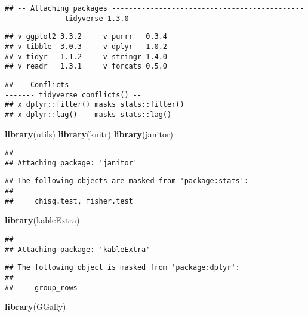 \documentclass[
]{article}
\newenvironment{Shaded}{\begin{snugshade}}{\end{snugshade}}
\newcommand{\KeywordTok}[1]{\textcolor[rgb]{0.13,0.29,0.53}{\textbf{#1}}}
\newcommand{\NormalTok}[1]{#1}
\begin{document}
\begin{verbatim}
## -- Attaching packages ---------------------------------------------------------- tidyverse 1.3.0 --
\end{verbatim}

\begin{verbatim}
## v ggplot2 3.3.2     v purrr   0.3.4
## v tibble  3.0.3     v dplyr   1.0.2
## v tidyr   1.1.2     v stringr 1.4.0
## v readr   1.3.1     v forcats 0.5.0
\end{verbatim}

\begin{verbatim}
## -- Conflicts ------------------------------------------------------------- tidyverse_conflicts() --
## x dplyr::filter() masks stats::filter()
## x dplyr::lag()    masks stats::lag()
\end{verbatim}

\begin{Shaded}
\begin{Highlighting}[]
\KeywordTok{library}\NormalTok{(utils)}
\KeywordTok{library}\NormalTok{(knitr)}
\KeywordTok{library}\NormalTok{(janitor)}
\end{Highlighting}
\end{Shaded}

\begin{verbatim}
## 
## Attaching package: 'janitor'
\end{verbatim}

\begin{verbatim}
## The following objects are masked from 'package:stats':
## 
##     chisq.test, fisher.test
\end{verbatim}

\begin{Shaded}
\begin{Highlighting}[]
\KeywordTok{library}\NormalTok{(kableExtra)}
\end{Highlighting}
\end{Shaded}

\begin{verbatim}
## 
## Attaching package: 'kableExtra'
\end{verbatim}

\begin{verbatim}
## The following object is masked from 'package:dplyr':
## 
##     group_rows
\end{verbatim}

\begin{Shaded}
\begin{Highlighting}[]
\KeywordTok{library}\NormalTok{(GGally)}
\end{Highlighting}
\end{Shaded}
\end{document}
